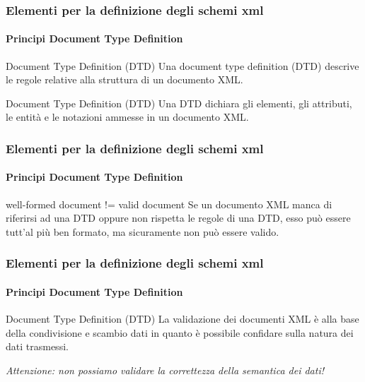 %

\begin{frame}
    \frametitle{Elementi per la definizione degli schemi xml}
    \framesubtitle{Principi Document Type Definition}
    \addtocounter{nframe}{1}

    \begin{block}{Document Type Definition (DTD)}
        Una document type definition (DTD) descrive le regole relative alla struttura di un documento XML.
    \end{block}

    \begin{block}{Document Type Definition (DTD)}
        Una DTD dichiara gli elementi, gli attributi, le entità e le notazioni ammesse in un documento XML.
    \end{block}

\end{frame}


\begin{frame}
    \frametitle{Elementi per la definizione degli schemi xml}
    \framesubtitle{Principi Document Type Definition}
    \addtocounter{nframe}{1}

    \begin{block}{well-formed document != valid document}
         Se un documento XML manca di riferirsi ad una DTD oppure non rispetta le regole di una DTD, esso può essere tutt'al più ben formato, ma sicuramente non può essere valido.
    \end{block}
\end{frame}

\begin{frame}
    \frametitle{Elementi per la definizione degli schemi xml}
    \framesubtitle{Principi Document Type Definition}
    \addtocounter{nframe}{1}

    \begin{block}{Document Type Definition (DTD)}
        La validazione dei documenti XML è alla base della condivisione e scambio dati in quanto è possibile confidare sulla natura dei dati trasmessi.
    \end{block}
   \textit{Attenzione: non possiamo validare la correttezza della semantica dei dati!}
\end{frame}

